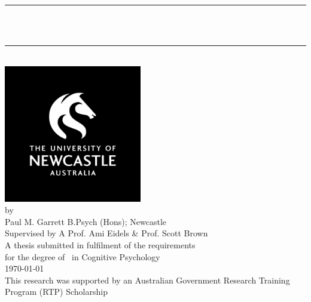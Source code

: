 \documentclass[12pt,oneside]{Thesis}
\title{\ttitle}
\begin{document}
\frontmatter
{}
\fancyhead{}
\rhead{\thepage} 
\lhead{} 
\pagestyle{fancy}
\newcommand{\HRule}{\rule{\linewidth}{0.5mm}}
\hypersetup{pdfsubject=\subjectname}
\hypersetup{pdfauthor=\authornames}
\hypersetup{pdfkeywords=\keywordnames}

\begin{titlepage}
\begin{center}
\HRule \\[.2cm] 
{\Huge \bfseries \ttitle}\\[.1cm] 
\HRule \\[1cm] 
\includegraphics[height=6cm,width=6cm]{Figures/Misc/UON.jpg}\\[.5cm] 
\large by\\
\large Paul M. Garrett B.Psych (Hons); Newcastle \\
\large Supervised by A Prof. Ami Eidels \& Prof. Scott Brown\\[.5cm]
\large A thesis submitted in fulfilment of the requirements\\ for the degree of \degreename~in Cognitive Psychology \\[0cm] 
\large \today \\[.5cm]
\large This research was supported by an Australian Government Research Training Program (RTP) Scholarship
\vfill
\end{center}
\end{titlepage}
\end{document}
